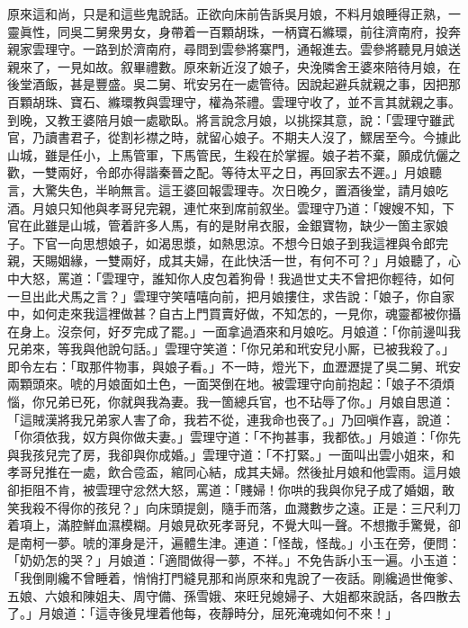 原來這和尚，只是和這些鬼說話。正欲向床前告訴吳月娘，不料月娘睡得正熟，一靈眞性，同吳二舅衆男女，身帶着一百顆胡珠，一柄寶石縧環，前往濟南府，投奔親家雲理守。一路到於濟南府，尋問到雲參將寨門，通報進去。雲參將聽見月娘送親來了，一見如故。叙畢禮數。原來新近沒了娘子，央浼隣舍王婆來陪待月娘，在後堂酒飯，甚是豐盛。吳二舅、玳安另在一處管待。因說起避兵就親之事，因把那百顆胡珠、寶石、縧環教與雲理守，權為茶禮。雲理守收了，並不言其就親之事。到晚，又教王婆陪月娘一處歇臥。將言說念月娘，以挑探其意，說：「雲理守雖武官，乃讀書君子，從割衫襟之時，就留心娘子。{}不期夫人沒了，鰥居至今。今據此山城，雖是任小，上馬管軍，下馬管民，生殺在於掌握。娘子若不棄，願成伉儷之歡，一雙兩好，令郎亦得諧秦晉之配。等待太平之日，再回家去不遲。」月娘聽言，大驚失色，半晌無言。這王婆回報雲理寺。次日晚夕，置酒後堂，請月娘吃酒。月娘只知他與孝哥兒完親，連忙來到席前叙坐。雲理守乃道：「嫂嫂不知，下官在此雖是山城，管着許多人馬，有的是財帛衣服，金銀寶物，缺少一箇主家娘子。下官一向思想娘子，如渴思漿，如熱思涼。不想今日娘子到我這裡與令郎完親，天賜姻緣，一雙兩好，成其夫婦，在此快活一世，有何不可？」月娘聽了，心中大怒，罵道：「雲理守，誰知你人皮包着狗骨！我過世丈夫不曾把你輕待，{}如何一旦出此犬馬之言？」雲理守笑嘻嘻向前，把月娘摟住，求告說：「娘子，你自家中，如何走來我這裡做甚？自古上門買賣好做，不知怎的，一見你，魂靈都被你攝在身上。沒奈何，好歹完成了罷。」一面拿過酒來和月娘吃。月娘道：「你前邊叫我兄弟來，等我與他說句話。」雲理守笑道：「你兄弟和玳安兒小厮，已被我殺了。」即令左右：「取那件物事，與娘子看。」不一時，燈光下，血瀝瀝提了吳二舅、玳安兩顆頭來。唬的月娘面如土色，一面哭倒在地。被雲理守向前抱起：「娘子不須煩惱，你兄弟已死，你就與我為妻。我一箇總兵官，也不玷辱了你。」月娘自思道：「這賊漢將我兄弟家人害了命，我若不從，連我命也䘮了。」乃回嗔作喜，說道：「你須依我，奴方與你做夫妻。」雲理守道：「不拘甚事，我都依。」月娘道：「你先與我孩兒完了房，我卻與你成婚。」雲理守道：「不打緊。」一面叫出雲小姐來，和孝哥兒推在一處，飲合卺盃，綰同心結，成其夫婦。然後扯月娘和他雲雨。這月娘卻拒阻不肯，被雲理守忿然大怒，罵道：「賤婦！你哄的我與你兒子成了婚姻，敢笑我殺不得你的孩兒？」向床頭提劍，隨手而落，血濺數步之遠。正是：三尺利刀着項上，滿腔鮮血濕模糊。月娘見砍死孝哥兒，不覺大叫一聲。不想撒手驚覺，卻是南柯一夢。唬的渾身是汗，遍體生津。連道：「怪哉，怪哉。」小玉在旁，便問：「奶奶怎的哭？」月娘道：「適間做得一夢，不祥。」不免告訴小玉一遍。小玉道：「我倒剛纔不曾睡着，悄悄打門縫見那和尚原來和鬼說了一夜話。剛纔過世俺爹、五娘、六娘和陳姐夫、周守備、孫雪娥、來旺兒媳婦子、大姐都來說話，各四散去了。」月娘道：「這寺後見埋着他每，夜靜時分，屈死淹魂如何不來！」

